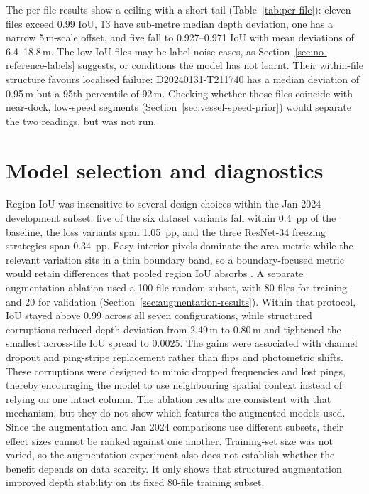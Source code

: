 The per-file results show a ceiling with a short tail (Table~\ref{tab:per-file}): eleven files exceed 0.99 IoU, 13 have sub-metre median depth deviation, one has a narrow 5\,m-scale offset, and five fall to 0.927--0.971 IoU with mean deviations of 6.4--18.8\,m. The low-IoU files may be label-noise cases, as Section~\ref{sec:no-reference-labels} suggests, or conditions the model has not learnt. Their within-file structure favours localised failure: D20240131-\allowbreak T211740 has a median deviation of 0.95\,m but a 95th percentile of 92\,m. Checking whether those files coincide with near-dock, low-speed segments (Section~\ref{sec:vessel-speed-prior}) would separate the two readings, but was not run.

\section{Model selection and diagnostics}

Region IoU was insensitive to several design choices within the Jan 2024 development subset: five of the six dataset variants fall within 0.4~pp of the baseline, the loss variants span 1.05~pp, and the three ResNet-34 freezing strategies span 0.34~pp. Easy interior pixels dominate the area metric while the relevant variation sits in a thin boundary band, so a boundary-focused metric would retain differences that pooled region IoU absorbs \cite{cheng_boundary_2021}. A separate augmentation ablation used a 100-file random subset, with 80 files for training and 20 for validation (Section~\ref{sec:augmentation-results}). Within that protocol, IoU stayed above 0.99 across all seven configurations, while structured corruptions reduced depth deviation from 2.49\,m to 0.80\,m and tightened the smallest across-file IoU spread to 0.0025. The gains were associated with channel dropout and ping-stripe replacement rather than flips and photometric shifts. These corruptions were designed to mimic dropped frequencies and lost pings, thereby encouraging the model to use neighbouring spatial context instead of relying on one intact column. The ablation results are consistent with that mechanism, but they do not show which features the augmented models used. Since the augmentation and Jan 2024 comparisons use different subsets, their effect sizes cannot be ranked against one another. Training-set size was not varied, so the augmentation experiment also does not establish whether the benefit depends on data scarcity. It only shows that structured augmentation improved depth stability on its fixed 80-file training subset.

